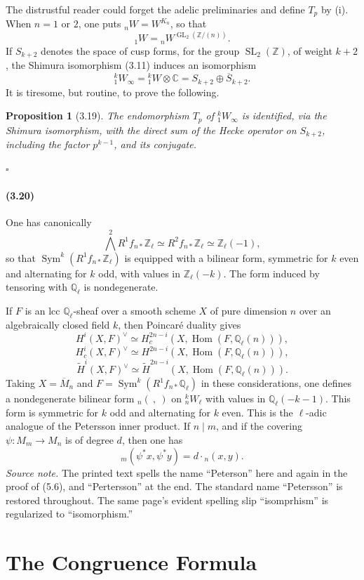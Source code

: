 \documentclass[10pt]{article}
\newcommand{\C}{\mathbb C}
\newcommand{\Q}{\mathbb Q}
\newcommand{\Z}{\mathbb Z}
\newcommand{\GL}{\operatorname{GL}}
\newcommand{\SL}{\operatorname{SL}}
\newcommand{\Hom}{\operatorname{Hom}}
\newcommand{\Sym}{\operatorname{Sym}}
\newcommand{\QED}{\hfill$\square$}
\newtheorem*{proposition}{Proposition}
\begin{document}
The distrustful reader could forget the adelic preliminaries and define $T_p$ by (i). When $n=1$ or $2$, one puts ${}_nW=W^{K_n}$, so that
\[
{}_1W={}_nW^{\GL_2(\Z/(n))}.
\]
If $S_{k+2}$ denotes the space of cusp forms, for the group $\SL_2(\Z)$, of weight $k+2$, the Shimura isomorphism (3.11) induces an isomorphism
\[
{}^k_1W_\infty={}^k_1W\otimes\C=S_{k+2}\oplus \overline{S}_{k+2}.
\]
It is tiresome, but routine, to prove the following.

\begin{proposition}[3.19]
The endomorphism $T_p$ of ${}^k_1W_\infty$ is identified, via the Shimura isomorphism, with the direct sum of the Hecke operator on $S_{k+2}$, including the factor $p^{k-1}$, and its conjugate.
\end{proposition}
\QED

\paragraph{(3.20)}
One has canonically
\[
\bigwedge^2 R^1f_{n*}\Z_\ell\simeq R^2f_{n*}\Z_\ell\simeq \Z_\ell(-1),
\]
so that $\Sym^k(R^1f_{n*}\Z_\ell)$ is equipped with a bilinear form, symmetric for $k$ even and alternating for $k$ odd, with values in $\Z_\ell(-k)$. The form induced by tensoring with $\Q_\ell$ is nondegenerate.

If $F$ is an lcc $\Q_\ell$-sheaf over a smooth scheme $X$ of pure dimension $n$ over an algebraically closed field $k$, then Poincaré duality gives
\[
H^i(X,F)^\vee\simeq H_c^{2n-i}(X,\Hom(F,\Q_\ell(n))),
\]
\[
H_c^i(X,F)^\vee\simeq H^{2n-i}(X,\Hom(F,\Q_\ell(n))),
\]
\[
\widetilde H^i(X,F)^\vee\simeq \widetilde H^{2n-i}(X,\Hom(F,\Q_\ell(n))).
\]
Taking $X=\overline M_n$ and $F=\Sym^k(R^1f_{n*}\Q_\ell)$ in these considerations, one defines a nondegenerate bilinear form ${}_n(\ ,\ )$ on ${}^k_nW_\ell$ with values in $\Q_\ell(-k-1)$. This form is symmetric for $k$ odd and alternating for $k$ even. This is the $\ell$-adic analogue of the Petersson inner product. If $n\mid m$, and if the covering $\psi:M_m\to M_n$ is of degree $d$, then one has
\[
{}_m(\psi^*x,\psi^*y)=d\cdot {}_n(x,y).
\]
\noindent\emph{Source note.} The printed text spells the name ``Peterson'' here and again in the proof of (5.6), and ``Pertersson'' at the end. The standard name ``Petersson'' is restored throughout. The same page's evident spelling slip ``isomprhism'' is regularized to ``isomorphism.''

\section{The Congruence Formula}
\end{document}
